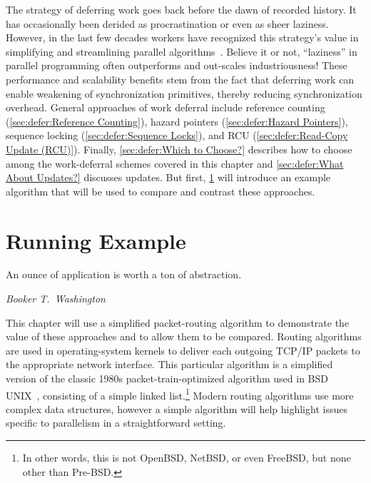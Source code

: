 
%

The strategy of deferring work goes back before the dawn of recorded
history.
It has occasionally been derided as procrastination or even as sheer laziness.
However, in the last few decades workers have recognized this strategy's value
in simplifying and streamlining parallel algorithms~\cite{Kung80,HMassalinPhD}.
Believe it or not, ``laziness'' in parallel programming often outperforms and
out-scales industriousness!
These performance and scalability benefits stem from the fact that
deferring work can enable weakening of synchronization primitives,
thereby reducing synchronization overhead.
General approaches of work deferral include
reference counting (\cref{sec:defer:Reference Counting}),
hazard pointers (\cref{sec:defer:Hazard Pointers}),
sequence locking (\cref{sec:defer:Sequence Locks}),
and RCU (\cref{sec:defer:Read-Copy Update (RCU)}).
Finally, \cref{sec:defer:Which to Choose?}
describes how to choose among the work-deferral schemes covered in
this chapter and \cref{sec:defer:What About Updates?}
discusses updates.
But first, \cref{sec:defer:Running Example} will introduce an example
algorithm that will be used to compare and contrast these approaches.

\section{Running Example}
\label{sec:defer:Running Example}
%
\epigraph{An ounce of application is worth a ton of abstraction.}
	 {\emph{Booker T.~Washington}}

This chapter will use a simplified packet-routing algorithm to demonstrate
the value of these approaches and to allow them to be compared.
Routing algorithms are used in operating-system kernels to
deliver each outgoing TCP/IP packets to the appropriate network interface.
This particular algorithm is a simplified version of the classic 1980s
packet-train-optimized algorithm used in BSD UNIX~\cite{VanJacobson88},
consisting of a simple linked list.\footnote{
	In other words, this is not OpenBSD, NetBSD, or even
	FreeBSD, but none other than Pre-BSD.}
Modern routing algorithms use more complex data structures, however a
simple algorithm will help highlight issues specific to parallelism in
a straightforward setting.

